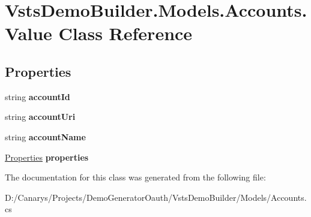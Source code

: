 \hypertarget{class_vsts_demo_builder_1_1_models_1_1_accounts_1_1_value}{}\section{Vsts\+Demo\+Builder.\+Models.\+Accounts.\+Value Class Reference}
\label{class_vsts_demo_builder_1_1_models_1_1_accounts_1_1_value}
\subsection*{Properties}
\begin{DoxyCompactItemize}
\item 
\mbox{\label{class_vsts_demo_builder_1_1_models_1_1_accounts_1_1_value_a26885c246867daa01714a87804d1e1f7}} 
string {\bfseries account\+Id}
\item 
\mbox{\label{class_vsts_demo_builder_1_1_models_1_1_accounts_1_1_value_a2a1074d2650306b1b5a5c5d1daa727c0}} 
string {\bfseries account\+Uri}
\item 
\mbox{\label{class_vsts_demo_builder_1_1_models_1_1_accounts_1_1_value_aa4deb7dca3b4e0505738ccbdb13d4551}} 
string {\bfseries account\+Name}
\item 
\mbox{\label{class_vsts_demo_builder_1_1_models_1_1_accounts_1_1_value_aebacab9f01af2d1f0bd56d50e9cc50ae}} 
\mbox{\hyperlink{class_vsts_demo_builder_1_1_models_1_1_accounts_1_1_properties}{Properties}} {\bfseries properties}
\end{DoxyCompactItemize}


The documentation for this class was generated from the following file\+:\begin{DoxyCompactItemize}
\item 
D\+:/\+Canarys/\+Projects/\+Demo\+Generator\+Oauth/\+Vsts\+Demo\+Builder/\+Models/Accounts.\+cs\end{DoxyCompactItemize}
